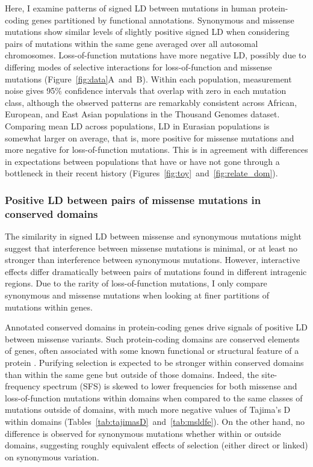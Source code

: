 \documentclass[]{article}
\begin{document}
Here, I examine patterns of signed LD between mutations in human protein-coding
genes partitioned by functional annotations. Synonymous and missense mutations
show similar levels of slightly positive signed LD when considering pairs of
mutations within the same gene averaged over all autosomal chromosomes.
Loss-of-function mutations have more negative LD, possibly due to differing
modes of selective interactions for loss-of-function and missense mutations
(Figure~\ref{fig:data}A~and~B). Within each population, measurement noise gives
95\% confidence intervals that overlap with zero in each mutation class,
although the observed patterns are remarkably consistent across African,
European, and East Asian populations in the Thousand Genomes dataset. Comparing
mean LD across populations, LD in Eurasian populations is somewhat larger on
average, that is, more positive for missense mutations and more negative for
loss-of-function mutations. This is in agreement with differences in
expectations between populations that have or have not gone through a
bottleneck in their recent history
(Figures~\ref{fig:toy}~and~\ref{fig:relate_dom}).

\subsubsection{Positive LD between pairs of missense mutations in conserved domains}

The similarity in signed LD between missense and synonymous mutations might
suggest that interference between missense mutations is minimal, or at least no
stronger than interference between synonymous mutations. However, interactive
effects differ dramatically between pairs of mutations found in different
intragenic regions. Due to the rarity of loss-of-function mutations, I only
compare synonymous and missense mutations when looking at finer partitions of
mutations within genes.

Annotated conserved domains in protein-coding genes drive signals of positive
LD between missense variants. Such protein-coding domains are conserved
elements of genes, often associated with some known functional or structural
feature of a protein \citep{Stanek2020-pa}. Purifying selection is expected to
be stronger within conserved domains than within the same gene but outside of
those domains.  Indeed, the site-frequency spectrum (SFS) is skewed to lower
frequencies for both missense and loss-of-function mutations within domains
when compared to the same classes of mutations outside of domains, with much
more negative values of Tajima's D within domains
(Tables~\ref{tab:tajimasD}~and~\ref{tab:msldfe}).  On the other hand, no
difference is observed for synonymous mutations whether within or outside
domains, suggesting roughly equivalent effects of selection (either direct or
linked) on synonymous variation.
\end{document}
